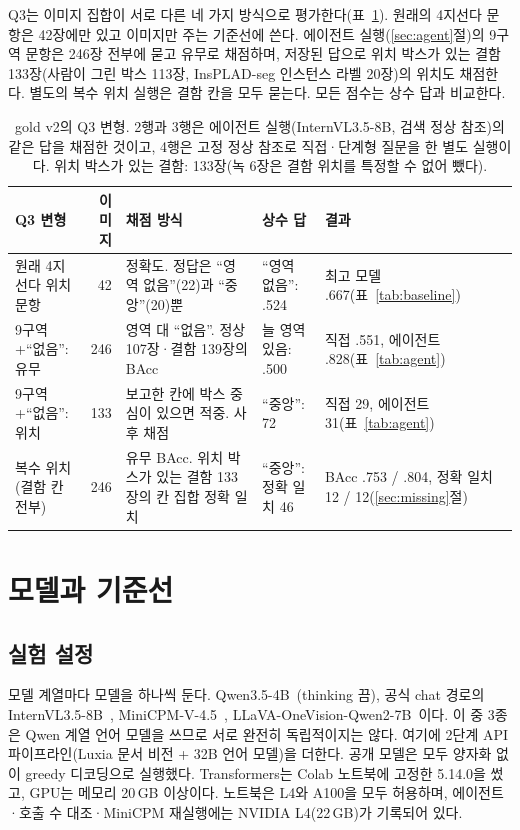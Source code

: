\documentclass[11pt]{article}
\begin{document}
Q3는 이미지 집합이 서로 다른 네 가지 방식으로 평가한다(표~\ref{tab:q3sets}). 원래의 4지선다 문항은 42장에만 있고 이미지만 주는 기준선에 쓴다. 에이전트 실행(\ref{sec:agent}절)의 9구역 문항은 246장 전부에 묻고 유무로 채점하며, 저장된 답으로 위치 박스가 있는 결함 133장(사람이 그린 박스 113장, InsPLAD-seg 인스턴스 라벨 20장)의 위치도 채점한다. 별도의 복수 위치 실행은 결함 칸을 모두 묻는다. 모든 점수는 상수 답과 비교한다.

\begin{table}[t]
\centering
\caption{gold v2의 Q3 변형. 2행과 3행은 에이전트 실행(InternVL3.5-8B, 검색 정상 참조)의 같은 답을 채점한 것이고, 4행은 고정 정상 참조로 직접·단계형 질문을 한 별도 실행이다. 위치 박스가 있는 결함: 133장(녹 6장은 결함 위치를 특정할 수 없어 뺐다).}
\label{tab:q3sets}
\small
\begin{tabular}{p{2.9cm}rp{4.1cm}p{2.3cm}p{3.4cm}}
\toprule
Q3 변형 & 이미지 & 채점 방식 & 상수 답 & 결과 \\
\midrule
원래 4지선다 위치 문항 & 42 & 정확도. 정답은 ``영역 없음''(22)과 ``중앙''(20)뿐 & ``영역 없음'': .524 & 최고 모델 .667(표~\ref{tab:baseline}) \\
9구역+``없음'': 유무 & 246 & 영역 대 ``없음''. 정상 107장·결함 139장의 BAcc & 늘 영역 있음: .500 & 직접 .551, 에이전트 .828(표~\ref{tab:agent}) \\
9구역+``없음'': 위치 & 133 & 보고한 칸에 박스 중심이 있으면 적중. 사후 채점 & ``중앙'': 72 & 직접 29, 에이전트 31(표~\ref{tab:agent}) \\
복수 위치(결함 칸 전부) & 246 & 유무 BAcc. 위치 박스가 있는 결함 133장의 칸 집합 정확 일치 & ``중앙'': 정확 일치 46 & BAcc .753 / .804, 정확 일치 12 / 12(\ref{sec:missing}절) \\
\bottomrule
\end{tabular}
\end{table}

\section{모델과 기준선}\label{sec:baselines}
\subsection{실험 설정}
모델 계열마다 모델을 하나씩 둔다. Qwen3.5-4B~\cite{qwen35}(thinking 끔), 공식 chat 경로의 InternVL3.5-8B~\cite{wang2025internvl35}, MiniCPM-V-4.5~\cite{yao2024minicpmv}, LLaVA-OneVision-Qwen2-7B~\cite{li2024llavaov}이다. 이 중 3종은 Qwen 계열 언어 모델을 쓰므로 서로 완전히 독립적이지는 않다. 여기에 2단계 API 파이프라인(Luxia 문서 비전 + 32B 언어 모델)을 더한다. 공개 모델은 모두 양자화 없이 greedy 디코딩으로 실행했다. Transformers는 Colab 노트북에 고정한 5.14.0을 썼고, GPU는 메모리 20\,GB 이상이다. 노트북은 L4와 A100을 모두 허용하며, 에이전트·호출 수 대조·MiniCPM 재실행에는 NVIDIA L4(22\,GB)가 기록되어 있다.
\end{document}
